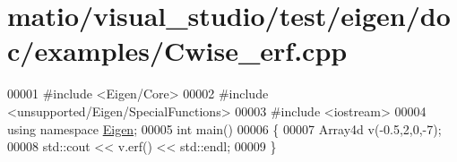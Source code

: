 \hypertarget{matio_2visual__studio_2test_2eigen_2doc_2examples_2_cwise__erf_8cpp_source}{}\section{matio/visual\+\_\+studio/test/eigen/doc/examples/\+Cwise\+\_\+erf.cpp}
\label{matio_2visual__studio_2test_2eigen_2doc_2examples_2_cwise__erf_8cpp_source}

\begin{DoxyCode}
00001 \textcolor{preprocessor}{#include <Eigen/Core>}
00002 \textcolor{preprocessor}{#include <unsupported/Eigen/SpecialFunctions>}
00003 \textcolor{preprocessor}{#include <iostream>}
00004 \textcolor{keyword}{using namespace }\hyperlink{namespace_eigen}{Eigen};
00005 \textcolor{keywordtype}{int} main()
00006 \{
00007   Array4d v(-0.5,2,0,-7);
00008   std::cout << v.erf() << std::endl;
00009 \}
\end{DoxyCode}
